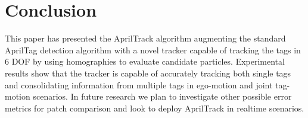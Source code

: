 \documentclass[letterpaper, 10 pt, conference]{ieeeconf}
\begin{document}
\section{Conclusion}

This paper has presented the AprilTrack algorithm augmenting the standard AprilTag detection algorithm with a novel tracker capable of tracking the tags in 6 DOF by using homographies to evaluate candidate particles. Experimental results show that the tracker is capable of accurately tracking both single tags and consolidating information from multiple tags in ego-motion and joint tag-motion scenarios. In future research we plan to investigate other possible error metrics for patch comparison and look to deploy AprilTrack in realtime scenarios.
\end{document}
